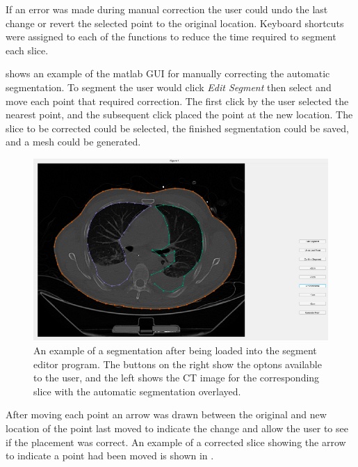 If an error was made during manual correction the user could undo
the last change or revert the selected point to the original location. 
Keyboard shortcuts were assigned to each of the functions to reduce the time required
to segment each slice.

 shows an example of the matlab GUI for manually correcting
the automatic segmentation. To segment the user would click \emph{Edit Segment} 
then select and move each point that required correction. The first click by the user
selected the nearest point, and the subsequent click placed the point at the new location. 
The slice to be corrected could be selected, the finished segmentation could
be saved, and a mesh could be generated. 

\begin{figure}
	\centering
	\includegraphics[width=\textwidth]{chapter5-CT_to_mesh/imgs/SegmentationAppLoaded.pdf}
	\caption[Manual segmentation interface with initial input]{\label{fig:seg-app-loaded}%
	An example of a segmentation after being loaded into the segment editor program. 
	The buttons on the right show the optons available to the user, and the left shows the 
	CT image for the corresponding slice with the automatic segmentation overlayed.
	}
\end{figure}

After moving each point an arrow was drawn between the original and new location of the
point last moved to indicate the change and allow the user to see if the
placement was correct. An example of a corrected slice showing the arrow to indicate
a point had been moved is shown in .

